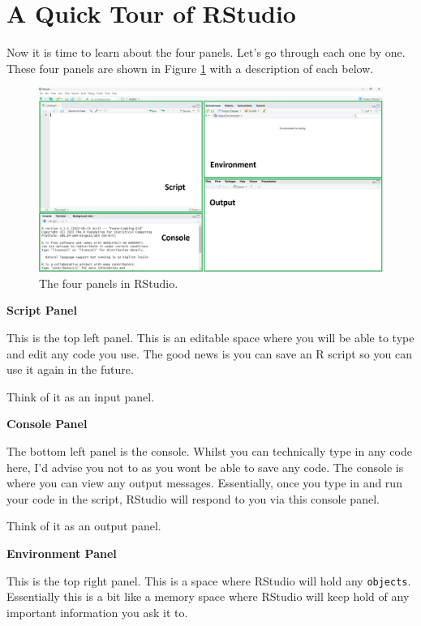 \documentclass[
]{book}
\let\oldsection\section
\renewcommand{\section}{\needspace{5\baselineskip}\oldsection}
\begin{document}
\section{A Quick Tour of RStudio}\label{a-quick-tour-of-rstudio}

Now it is time to learn about the four panels. Let's go through each one by one. These four panels are shown in Figure \ref{fig:fig6} with a description of each below.

\begin{figure}[H]

{\centering \includegraphics[width=1\linewidth]{images/rstudio3} 

}

\caption{The four panels in RStudio.}\label{fig:fig6}
\end{figure}

\textbf{Script Panel}

This is the top left panel. This is an editable space where you will be able to type and edit any code you use. The good news is you can save an R script so you can use it again in the future.

Think of it as an input panel.

\textbf{Console Panel}

The bottom left panel is the console. Whilst you can technically type in any code here, I'd advise you not to as you wont be able to save any code. The console is where you can view any output messages. Essentially, once you type in and run your code in the script, RStudio will respond to you via this console panel.

Think of it as an output panel.

\textbf{Environment Panel}

This is the top right panel. This is a space where RStudio will hold any \texttt{objects}. Essentially this is a bit like a memory space where RStudio will keep hold of any important information you ask it to.
\end{document}
